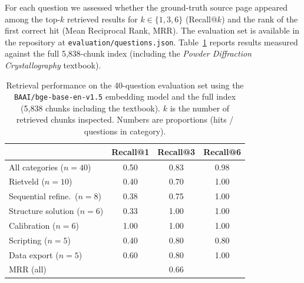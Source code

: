 For each question we assessed whether the ground-truth source page
appeared among the top-$k$ retrieved results for $k \in \{1, 3, 6\}$
(Recall@$k$) and the rank of the first correct hit (Mean Reciprocal
Rank, MRR).
The evaluation set is available in the repository at
\texttt{evaluation/questions.json}.
Table~\ref{tab:retrieval} reports results measured against
the full 5{,}838-chunk index (including the \textit{Powder Diffraction
Crystallography} textbook).

\begin{table}[h]
  \centering
  \caption{Retrieval performance on the 40-question evaluation set
           using the \texttt{BAAI/bge-base-en-v1.5} embedding model
           and the full index (5{,}838 chunks including the textbook).
           $k$ is the number of retrieved chunks inspected.
           Numbers are proportions (hits / questions in category).}
  \label{tab:retrieval}
  \begin{tabular}{lccc}
    \toprule
    & Recall@1 & Recall@3 & Recall@6 \\
    \midrule
    All categories ($n=40$)      & 0.50 & 0.83 & 0.98 \\
    Rietveld ($n=10$)            & 0.40 & 0.70 & 1.00 \\
    Sequential refine.\ ($n=8$)  & 0.38 & 0.75 & 1.00 \\
    Structure solution ($n=6$)   & 0.33 & 1.00 & 1.00 \\
    Calibration ($n=6$)          & 1.00 & 1.00 & 1.00 \\
    Scripting ($n=5$)            & 0.40 & 0.80 & 0.80 \\
    Data export ($n=5$)          & 0.60 & 0.80 & 1.00 \\
    \midrule
    MRR (all)           & \multicolumn{3}{c}{0.66} \\
    \bottomrule
  \end{tabular}
\end{table}

